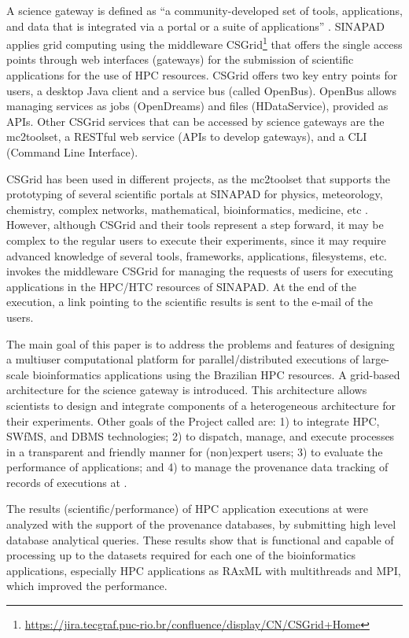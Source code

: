 A science gateway \cite{GESING2018544} is defined as “a community-developed set of tools, applications, and data that is integrated via a portal or a suite of applications” \cite{Gesing:2016:USG:3037851.3037858}. SINAPAD applies grid computing \cite{doi:10.1177/109434200101500302} using the middleware CSGrid\footnote{\url{https://jira.tecgraf.puc-rio.br/confluence/display/CN/CSGrid+Home}} that offers the single access points through web interfaces (gateways) for the submission of scientific applications for the use of HPC resources. CSGrid offers two key entry points for users, a desktop Java client and a service bus (called OpenBus). OpenBus allows managing services as jobs (OpenDreams) and files (HDataService), provided as APIs. Other CSGrid services that can be accessed by science gateways are the mc2toolset, a RESTful web service (APIs to develop gateways), and a CLI (Command Line Interface). 

CSGrid has been used in different projects, as the mc2toolset that supports the prototyping of several scientific portals at SINAPAD for physics, meteorology, chemistry, complex networks, mathematical, bioinformatics, medicine, etc \cite{doi:10.1002/cpe.3258}. However, although CSGrid and their tools represent a step forward, it may be complex to the regular users to execute their experiments, since it may require advanced knowledge of several tools, frameworks, applications, filesystems, etc. \system invokes the middleware CSGrid for managing the requests of users for executing applications in the HPC/HTC resources of SINAPAD. At the end of the execution, a link pointing to the scientific results is sent to the e-mail of the users. 

The main goal of this paper is to address the problems and features of designing a multiuser computational platform for parallel/distributed executions of large-scale bioinformatics applications using the Brazilian HPC resources. A grid-based architecture for the science gateway is introduced. This architecture allows scientists to design and integrate components of a heterogeneous architecture for their experiments. Other goals of the Project called \system are: 1) to integrate HPC, SWfMS, and DBMS technologies; 2) to dispatch, manage, and execute processes in a transparent and friendly manner for (non)expert users; 3) to evaluate the performance of applications; and 4) to manage the provenance data tracking of records of executions at \system.

The results (scientific/performance) of HPC application executions at \system were analyzed with the support of the provenance databases, by submitting high level database analytical queries. These results show that \system is functional and capable of processing up to the datasets required for each one of the bioinformatics applications, especially HPC applications as RAxML \cite{raxmlVIII2014} with multithreads and MPI, which improved the performance. 

